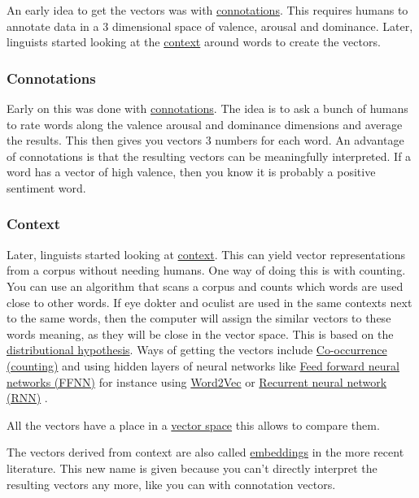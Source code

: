 \documentclass[
  11pt,
  british,
]{article}
\begin{document}
An early idea to get the vectors was with
\href{Connotations.md}{connotations}. This requires humans to annotate
data in a 3 dimensional space of valence, arousal and dominance. Later,
linguists started looking at the \href{Context.md}{context} around words
to create the vectors.

\hypertarget{connotations}{%
\subsubsection{Connotations}\label{connotations}}

Early on this was done with \href{Connotations.md}{connotations}. The
idea is to ask a bunch of humans to rate words along the valence arousal
and dominance dimensions and average the results. This then gives you
vectors 3 numbers for each word. An advantage of connotations is that
the resulting vectors can be meaningfully interpreted. If a word has a
vector of high valence, then you know it is probably a positive
sentiment word.

\hypertarget{context}{%
\subsubsection{Context}\label{context}}

Later, linguists started looking at \href{Context.md}{context}. This can
yield vector representations from a corpus without needing humans. One
way of doing this is with counting. You can use an algorithm that scans
a corpus and counts which words are used close to other words. If eye
dokter and oculist are used in the same contexts next to the same words,
then the computer will assign the similar vectors to these words
meaning, as they will be close in the vector space. This is based on the
\href{Distributional\%20hypothesis.md}{distributional hypothesis}. Ways
of getting the vectors include \href{Co-occurrence.md}{Co-occurrence
(counting)} and using hidden layers of neural networks like
\href{../Prediction/Feed\%20forward\%20neural\%20networks\%20(FFNN).md}{Feed
forward neural networks (FFNN)} for instance using
\href{Word2Vec.md}{Word2Vec} or
\href{../Prediction/Recurrent\%20neural\%20network\%20(RNN).md}{Recurrent
neural network (RNN)} .

All the vectors have a place in a \href{Vector\%20Space.md}{vector
space} this allows to compare them.

The vectors derived from context are also called
\href{Embeddings.md}{embeddings} in the more recent literature. This new
name is given because you can't directly interpret the resulting vectors
any more, like you can with connotation vectors.
\end{document}
